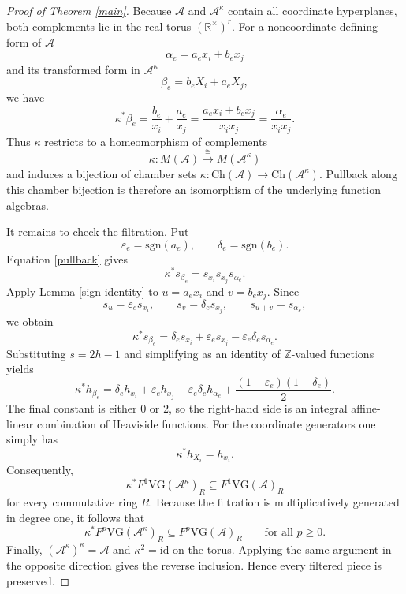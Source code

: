 \documentclass{amsart}
\numberwithin{equation}{section}
\theoremstyle{plain}
\theoremstyle{remark}
\theoremstyle{definition}
\numberwithin{equation}{section}
\newcommand{\R}{\mathbb{R}}
\newcommand{\Z}{\mathbb{Z}}
\newcommand{\A}{\mathcal{A}}
\newcommand{\Ch}{\mathrm{Ch}}
\newcommand{\VG}{\mathrm{VG}}
\newcommand{\sgn}{\mathrm{sgn}}
\begin{document}
\begin{proof}[Proof of Theorem \ref{main}]
Because $\A$ and $\A^\kappa$ contain all coordinate hyperplanes, both complements lie in the real torus $(\R^\times)^r$.  For a noncoordinate defining form of $\A$
\[
\alpha_e=a_ex_i+b_ex_j
\]
and its transformed form in $\A^\kappa$
\[
\beta_e=b_eX_i+a_eX_j,
\]
we have
\begin{equation}\label{pullback}
\kappa^*\beta_e
=\frac{b_e}{x_i}+\frac{a_e}{x_j}
=\frac{a_ex_i+b_ex_j}{x_ix_j}
=\frac{\alpha_e}{x_ix_j}.
\end{equation}
Thus $\kappa$ restricts to a homeomorphism of complements
\[
\kappa:M(\A)\xrightarrow{\ \cong\ }M(\A^\kappa)
\]
and induces a bijection of chamber sets $\kappa: \Ch(\A)\to\Ch(\A^\kappa)$.  Pullback along this chamber bijection is therefore an isomorphism of the underlying function algebras.

It remains to check the filtration.  Put
\[
\varepsilon_e=\sgn(a_e),\qquad \delta_e=\sgn(b_e).
\]
Equation \eqref{pullback} gives
\[
\kappa^*s_{\beta_e}=s_{x_i}s_{x_j}s_{\alpha_e}.
\]
Apply Lemma \ref{sign-identity} to $u=a_ex_i$ and $v=b_ex_j$.  Since
\[
s_u=\varepsilon_es_{x_i},\qquad
s_v=\delta_es_{x_j},\qquad
s_{u+v}=s_{\alpha_e},
\]
we obtain
\begin{equation}\label{sign-pullback}
\kappa^*s_{\beta_e}
=\delta_es_{x_i}+\varepsilon_es_{x_j}
-\varepsilon_e\delta_es_{\alpha_e}.
\end{equation}
Substituting $s=2h-1$ and simplifying as an identity of $\Z$-valued functions yields
\begin{equation}\label{heaviside-pullback}
\kappa^*h_{\beta_e}
=\delta_eh_{x_i}+\varepsilon_eh_{x_j}
-\varepsilon_e\delta_eh_{\alpha_e}
+\frac{(1-\varepsilon_e)(1-\delta_e)}{2}.
\end{equation}
The final constant is either $0$ or $2$, so the right-hand side is an integral affine-linear combination of Heaviside functions.  For the coordinate generators one simply has
\[
\kappa^*h_{X_i}=h_{x_i}.
\]
Consequently,
\[
\kappa^*F^1\VG(\A^\kappa)_R\subseteq F^1\VG(\A)_R
\]
for every commutative ring $R$.  Because the filtration is multiplicatively generated in degree one, it follows that
\[
\kappa^*F^p\VG(\A^\kappa)_R\subseteq F^p\VG(\A)_R
\qquad\text{for all }p\geq0.
\]
Finally, $(\A^\kappa)^\kappa=\A$ and $\kappa^2=\mathrm{id}$ on the torus.  Applying the same argument in the opposite direction gives the reverse inclusion.  Hence every filtered piece is preserved.
\end{proof}
\end{document}
